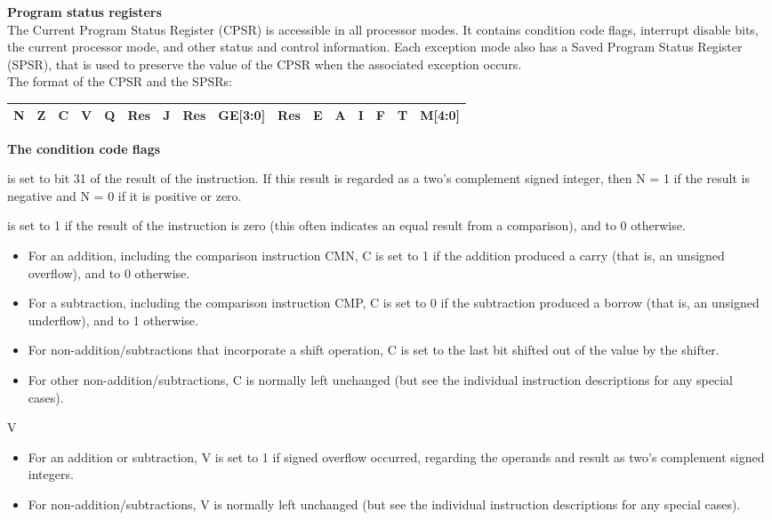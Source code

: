 \textbf{Program status registers}\\ 
The Current Program Status Register (CPSR) is accessible in all processor modes. It contains condition code flags, interrupt disable bits, the current processor mode, and other status and control information. Each exception mode also has a Saved Program Status Register (SPSR), that is used to preserve the value of the CPSR when the associated exception occurs.\\
The format of the CPSR and the SPSRs:\\
\begin{tabular}{|c|c|c|c|c|c|c|c|c|c|c|c|c|c|c|c|}
\hline
N&Z&C&V&Q&Res&J&Res&GE[3:0]&Res&E&A&I&F&T&M[4:0]\\
\hline
\end{tabular}

\textbf{The condition code flags}\\
\begin{description}
\item[N] is set to bit 31 of the result of the instruction. If this result is regarded as a two's complement signed integer, then N = 1 if the result is negative and N = 0 if it is positive or zero.
\item[Z] is set to 1 if the result of the instruction is zero (this often indicates an equal result from a comparison), and to 0 otherwise.
\item[C] 
\begin{itemize}
\item For an addition, including the comparison instruction CMN, C is set to 1 if the addition
produced a carry (that is, an unsigned overflow), and to 0 otherwise.
\item For a subtraction, including the comparison instruction CMP, C is set to 0 if the
subtraction produced a borrow (that is, an unsigned underflow), and to 1 otherwise.
\item For non-addition/subtractions that incorporate a shift operation, C is set to the last bit
shifted out of the value by the shifter.
\item For other non-addition/subtractions, C is normally left unchanged (but see the
individual instruction descriptions for any special cases).
\end{itemize} 
\item{V} 
\begin{itemize}
\item For an addition or subtraction, V is set to 1 if signed overflow occurred, regarding the
operands and result as two's complement signed integers.
\item For non-addition/subtractions, V is normally left unchanged (but see the individual
instruction descriptions for any special cases).
\end{itemize}
\end{description}

